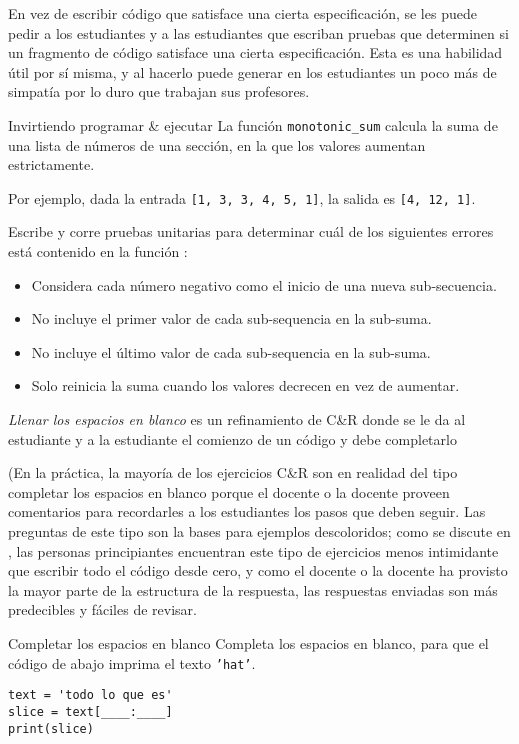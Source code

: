En vez de escribir código que satisface una cierta especificación, 
se les puede pedir a los estudiantes y a las estudiantes que escriban pruebas que determinen si un fragmento de código satisface una cierta especificación. 
Esta es una habilidad útil por sí misma, y al hacerlo puede generar en los estudiantes un poco más de simpatía por lo duro que trabajan sus profesores.

\begin{aside}{Invirtiendo programar \& ejecutar}
 La función \texttt{monotonic\_sum} calcula la suma de una lista de números de una sección, en la que los valores aumentan estrictamente.

Por ejemplo,
  dada la entrada \texttt{[1,\ 3,\ 3,\ 4,\ 5,\ 1]},
  la salida es  \texttt{[4,\ 12,\ 1]}.

Escribe y corre pruebas unitarias para determinar cuál de los siguientes errores está contenido en la función :

   \begin{itemize}
  \item
    Considera cada número negativo como el inicio de una nueva sub-secuencia.
  \item
    No incluye el primer valor de cada sub-sequencia en la sub-suma.
  \item
    No incluye el último valor de cada sub-sequencia en la sub-suma.
  \item
    Solo reinicia la suma cuando los valores decrecen en vez de aumentar.
  \end{itemize}
\end{aside}


\emph{Llenar los espacios en blanco} es un refinamiento de C\&R
donde se le da al estudiante y a la estudiante  el comienzo de un código y debe completarlo

(En la práctica, la mayoría de los ejercicios C\&R son en realidad del tipo completar los espacios en blanco porque el docente o la  docente proveen comentarios
para recordarles a los estudiantes los pasos que deben seguir. 
Las preguntas de este tipo son la bases para  ejemplos descoloridos;
como se discute en ,
las personas principiantes encuentran este tipo de ejercicios  menos intimidante que escribir todo el código desde cero,
y como el docente o la docente ha provisto la mayor parte de la estructura de la respuesta,
las respuestas enviadas son más predecibles y fáciles de revisar.

\begin{aside}{Completar los espacios en blanco}
 Completa los espacios en blanco,
 para que el código de abajo imprima el texto  \texttt{'hat'}.

\begin{verbatim}
text = 'todo lo que es'
slice = text[____:____]
print(slice)
\end{verbatim}
\end{aside}

